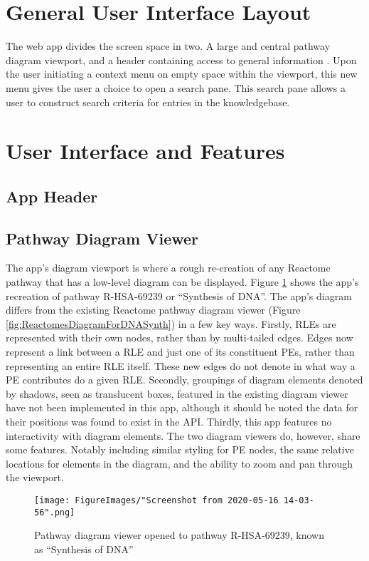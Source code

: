 \documentclass[12pt]{report}
\begin{document}
\section {General User Interface Layout}
The web app divides the screen space in two. A large and central pathway diagram viewport, and a header containing access to general information . Upon the user initiating a context menu on empty space within the viewport, this new menu gives the user a choice to open a search pane. This search pane allows a user to construct search criteria for entries in the knowledgebase.

\section {User Interface and Features}

\subsection{App Header}

\subsection{Pathway Diagram Viewer}
The app's diagram viewport is where a rough re-creation of any Reactome pathway that has a low-level diagram can be displayed. Figure \ref{fig:DiagramForDNASynth} shows the app's recreation of pathway R-HSA-69239 or ``Synthesis of DNA''. The app's diagram differs from the existing Reactome pathway diagram viewer (Figure \ref{fig:ReactomesDiagramForDNASynth}) in a few key ways. Firstly, RLEs are represented with their own nodes, rather than by multi-tailed edges. Edges now represent a link between a RLE and just one of its constituent PEs, rather than representing an entire RLE itself. These new edges do not denote in what way a PE contributes do a given RLE. Secondly, groupings of diagram elements denoted by shadows, seen as translucent boxes, featured in the existing diagram viewer have not been implemented in this app, although it should be noted the data for their positions was found to exist in the API. Thirdly, this app features no interactivity with diagram elements. The two diagram viewers do, however, share some features. Notably including similar styling for PE nodes, the same relative locations for elements in the diagram, and the ability to zoom and pan through the viewport.
\newpage

\begin{figure}[t!]
	\begin{center}
		\texttt{[image: FigureImages/"Screenshot from 2020-05-16 14-03-56".png]}
	\end{center}
	\caption{Pathway diagram viewer opened to pathway R-HSA-69239, known as ``Synthesis of DNA''}

	\label{fig:DiagramForDNASynth}
\end{figure}
\end{document}
